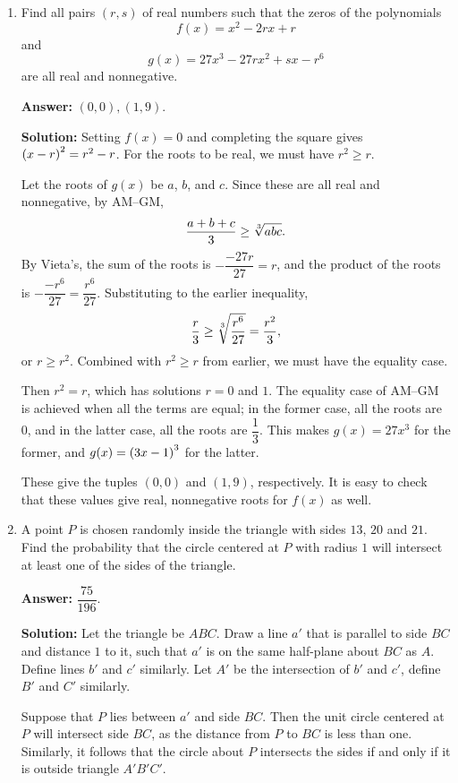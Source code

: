 \documentclass[11pt,paper=letter]{scrartcl}
\begin{document}
\begin{enumerate}[left=0pt]

\item Find all pairs $(r, s)$ of real numbers such that the zeros of the polynomials $$f(x) = x^2 - 2rx + r$$ and $$g(x) = 27x^3 - 27rx^2 + sx - r^6$$ are all real and nonnegative.

\textbf{Answer:} $\boxed{(0, 0), (1, 9)}$.

\textbf{Solution:} Setting $f(x) = 0$ and completing the square gives $\left( x - r \right)^2 = r^2 - r$. For the roots to be real, we must have $r^2 \geq r$. 

Let the roots of $g(x)$ be $a$, $b$, and $c$. Since these are all real and nonnegative, by AM--GM, $$\dfrac{a+b+c}3 \geq \sqrt[3]{abc}.$$ By Vieta's, the sum of the roots is $-\dfrac{-27r}{27} = r$, and the product of the roots is $-\dfrac{-r^6}{27} = \dfrac{r^6}{27}$. Substituting to the earlier inequality, $$\dfrac{r}3 \geq \sqrt[3]{\dfrac{r^6}{27}} = \dfrac{r^2}3,$$ or $r \geq r^2$. Combined with $r^2 \geq r$ from earlier, we must have the equality case.

Then $r^2 = r$, which has solutions $r = 0$ and $1$. The equality case of AM--GM is achieved when all the terms are equal; in the former case, all the roots are $0$, and in the latter case, all the roots are $\dfrac13$. This makes $g(x) = 27x^3$ for the former, and $g(x) = \left( 3x - 1 \right)^3$ for the latter.

These give the tuples $(0, 0)$ and $(1, 9)$, respectively. It is easy to check that these values give real, nonnegative roots for $f(x)$ as well.

\item A point $P$ is chosen randomly inside the triangle with sides $13$, $20$ and $21$. Find the probability that the circle centered at $P$ with radius $1$ will intersect at least one of the sides of the triangle.

\textbf{Answer:} $\boxed{\dfrac{75}{196}}$.

\textbf{Solution:} Let the triangle be $ABC$. Draw a line $a'$ that is parallel to side $BC$ and distance $1$ to it, such that $a'$ is on the same half-plane about $BC$ as $A$. Define lines $b'$ and $c'$ similarly. Let $A'$ be the intersection of $b'$ and $c'$, define $B'$ and $C'$ similarly.

Suppose that $P$ lies between $a'$ and side $BC$. Then the unit circle centered at $P$ will intersect side $BC$, as the distance from $P$ to $BC$ is less than one. Similarly, it follows that the circle about $P$ intersects the sides if and only if it is outside triangle $A'B'C'$.


\end{enumerate}
\end{document}
